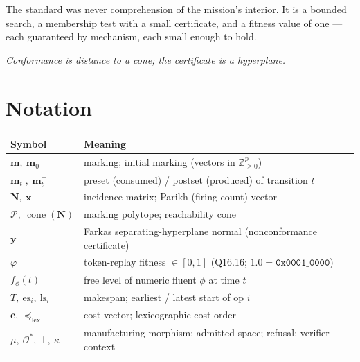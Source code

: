 \documentclass[11pt,oneside]{book}
\theoremstyle{definition}
\theoremstyle{plain}
\theoremstyle{remark}
\newcommand{\Adm}{\mathcal{O}^{*}}             %
\newcommand{\muop}{\mu}                        %
\newcommand{\Rfsl}{\bot}                        %
\newcommand{\CL}{\kappa}                       %
\newcommand{\Fitness}{\varphi}
\DeclareMathOperator{\cone}{cone}
\newcommand{\Poly}{\mathcal{P}}                %
\newcommand{\Nmat}{\mathbf{N}}                 %
\newcommand{\Zplus}{\mathbb{Z}_{\ge 0}}
\newcommand{\CostV}{\bm c}                     %
\newcommand{\code}[1]{\texttt{#1}}
\begin{document}
The standard was never comprehension of the mission's interior. It is a bounded search, a
membership test with a small certificate, and a fitness value of one --- each guaranteed by
mechanism, each small enough to hold.

\begin{center}\itshape Conformance is distance to a cone; the certificate is a hyperplane.\end{center}

\appendix
\chapter{Notation}
\begin{tabular}{ll}
\toprule
Symbol & Meaning\\
\midrule
$\bm m,\ \bm m_{0}$ & marking; initial marking (vectors in $\Zplus^{p}$)\\
$\bm m^{-}_{t},\ \bm m^{+}_{t}$ & preset (consumed) / postset (produced) of transition $t$\\
$\Nmat,\ \bm x$ & incidence matrix; Parikh (firing-count) vector\\
$\Poly,\ \cone(\Nmat)$ & marking polytope; reachability cone\\
$\bm y$ & Farkas separating-hyperplane normal (nonconformance certificate)\\
$\Fitness$ & token-replay fitness $\in[0,1]$ (Q16.16; $1.0=\code{0x0001\_0000}$)\\
$f_\phi(t)$ & free level of numeric fluent $\phi$ at time $t$\\
$T,\ \text{es}_i,\ \text{ls}_i$ & makespan; earliest / latest start of op $i$\\
$\CostV,\ \preceq_{\mathrm{lex}}$ & cost vector; lexicographic cost order\\
$\muop,\ \Adm,\ \Rfsl,\ \CL$ & manufacturing morphism; admitted space; refusal; verifier context\\
\bottomrule
\end{tabular}
\end{document}
